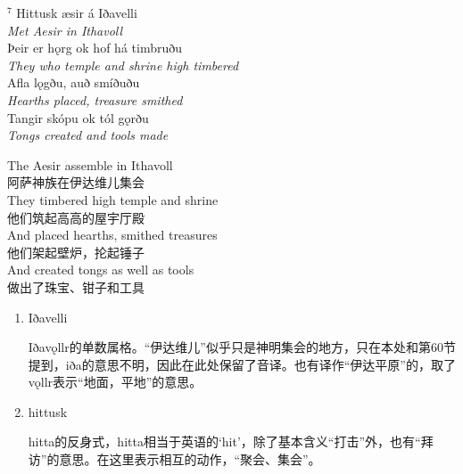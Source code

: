 \begin{paracol}{2}
    \noindent
    $^7 $ Hittusk æsir á Iðavelli\\
    \textit{Met Aesir in Ithavoll}\\
    Þeir er hǫrg ok hof há timbruðu\\
    \textit{They who temple and shrine high timbered}\\
    Afla lǫgðu, auð smíðuðu\\
    \textit{Hearths placed, treasure smithed}\\
    Tangir skópu ok tól gǫrðu\\
    \textit{Tongs created and tools made}\\

    \switchcolumn

    \noindent
    The Aesir assemble in Ithavoll\\
    阿萨神族在伊达维儿集会\\
    They timbered high temple and shrine\\
    他们筑起高高的屋宇厅殿\\
    And placed hearths, smithed treasures\\
    他们架起壁炉，抡起锤子\\
    And created tongs as well as tools\\
    做出了珠宝、钳子和工具\\
\end{paracol}

\begin{grammar*}{}
    \begin{enumerate}[leftmargin=*]
        \item Iðavelli

              Iðav\k{o}llr的单数属格。“伊达维儿”似乎只是神明集会的地方，只在本处和第60节提到，iða的意思不明，因此在此处保留了音译。也有译作“伊达平原”的，取了v\k{o}llr表示“地面，平地”的意思。

        \item hittusk

              hitta的反身式，hitta相当于英语的`hit'，除了基本含义“打击”外，也有“拜访”的意思。在这里表示相互的动作，“聚会、集会”。
    \end{enumerate}
\end{grammar*}
\medskip %

